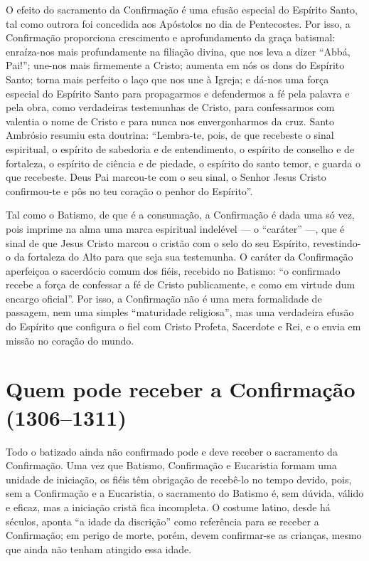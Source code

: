 O efeito do sacramento da Confirmação é uma efusão especial do Espírito Santo, tal como outrora foi concedida aos Apóstolos no dia de Pentecostes. Por isso, a Confirmação proporciona crescimento e aprofundamento da graça batismal: enraíza-nos mais profundamente na filiação divina, que nos leva a dizer ``Abbá, Pai!''; une-nos mais firmemente a Cristo; aumenta em nós os dons do Espírito Santo; torna mais perfeito o laço que nos une à Igreja; e dá-nos uma força especial do Espírito Santo para propagarmos e defendermos a fé pela palavra e pela obra, como verdadeiras testemunhas de Cristo, para confessarmos com valentia o nome de Cristo e para nunca nos envergonharmos da cruz. Santo Ambrósio resumiu esta doutrina: ``Lembra-te, pois, de que recebeste o sinal espiritual, o espírito de sabedoria e de entendimento, o espírito de conselho e de fortaleza, o espírito de ciência e de piedade, o espírito do santo temor, e guarda o que recebeste. Deus Pai marcou-te com o seu sinal, o Senhor Jesus Cristo confirmou-te e pôs no teu coração o penhor do Espírito''.

Tal como o Batismo, de que é a consumação, a Confirmação é dada uma só vez, pois imprime na alma uma marca espiritual indelével --- o ``caráter'' ---, que é sinal de que Jesus Cristo marcou o cristão com o selo do seu Espírito, revestindo-o da fortaleza do Alto para que seja sua testemunha. O caráter da Confirmação aperfeiçoa o sacerdócio comum dos fiéis, recebido no Batismo: ``o confirmado recebe a força de confessar a fé de Cristo publicamente, e como em virtude dum encargo oficial''. Por isso, a Confirmação não é uma mera formalidade de passagem, nem uma simples ``maturidade religiosa'', mas uma verdadeira efusão do Espírito que configura o fiel com Cristo Profeta, Sacerdote e Rei, e o envia em missão no coração do mundo.

\section{Quem pode receber a Confirmação (1306--1311)}

Todo o batizado ainda não confirmado pode e deve receber o sacramento da Confirmação. Uma vez que Batismo, Confirmação e Eucaristia formam uma unidade de iniciação, os fiéis têm obrigação de recebê-lo no tempo devido, pois, sem a Confirmação e a Eucaristia, o sacramento do Batismo é, sem dúvida, válido e eficaz, mas a iniciação cristã fica incompleta. O costume latino, desde há séculos, aponta ``a idade da discrição'' como referência para se receber a Confirmação; em perigo de morte, porém, devem confirmar-se as crianças, mesmo que ainda não tenham atingido essa idade.

